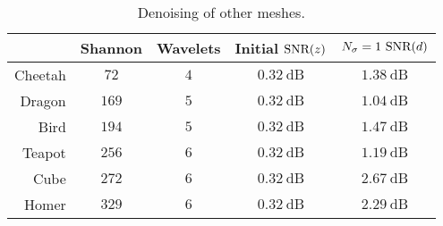 \begin{table}
	\centering
	\caption[
		Denoising of other meshes
	]{
		Denoising of other meshes.
	}\label{tab:chapter5_denoising}
	\begin{tabular}{@{}rcccc@{}}
		\toprule
		        & Shannon       & Wavelets    & Initial \(\text{SNR}(z)\) & \(N_{\sigma}=1\ \snr{d}\) \\
		\midrule
		Cheetah & \(\num{72}\)  & \(\num{4}\) & \(\SI{0.32}{\dB}\)  & \(\SI{1.38}{\dB}\)        \\
		Dragon  & \(\num{169}\) & \(\num{5}\) & \(\SI{0.32}{\dB}\)  & \(\SI{1.04}{\dB}\)        \\
		Bird    & \(\num{194}\) & \(\num{5}\) & \(\SI{0.32}{\dB}\)  & \(\SI{1.47}{\dB}\)        \\
		Teapot  & \(\num{256}\) & \(\num{6}\) & \(\SI{0.32}{\dB}\)  & \(\SI{1.19}{\dB}\)        \\
		Cube    & \(\num{272}\) & \(\num{6}\) & \(\SI{0.32}{\dB}\)  & \(\SI{2.67}{\dB}\)        \\
		Homer   & \(\num{329}\) & \(\num{6}\) & \(\SI{0.32}{\dB}\)  & \(\SI{2.29}{\dB}\)        \\
		\bottomrule
	\end{tabular}
\end{table}
